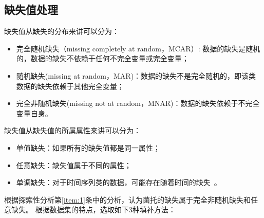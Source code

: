 \documentclass[lang=cn,11pt,a4paper,cite=super]{elegantpaper}
\begin{document}
\subsection{缺失值处理}\label{sec:missingdata}
缺失值从缺失的分布来讲可以分为：
\begin{itemize}
   \item 完全随机缺失（missing completely at random，MCAR）:
   数据的缺失是随机的，数据的缺失不依赖于任何不完全变量或完全变量；
   \item 随机缺失(missing at random，MAR)：数据的缺失不是完全随机的，即该类数据的缺失依赖于其他完全变量；
   \item 完全非随机缺失(missing not at random，MNAR)：数据的缺失依赖于不完全变量自身。
\end{itemize}
缺失值从缺失值的所属属性来讲可以分为：
\begin{itemize}
   \item 单值缺失：如果所有的缺失值都是同一属性；
   \item 任意缺失：缺失值属于不同的属性；
   \item 单调缺失：对于时间序列类的数据，可能存在随着时间的缺失~\cite{queshi}。
\end{itemize}
\par 根据探索性分析第\ref{item:1}条中的分析，认为菌托的缺失属于完全非随机缺失和任意缺失。
根据数据集的特点，选取如下3种填补方法：
\end{document}
